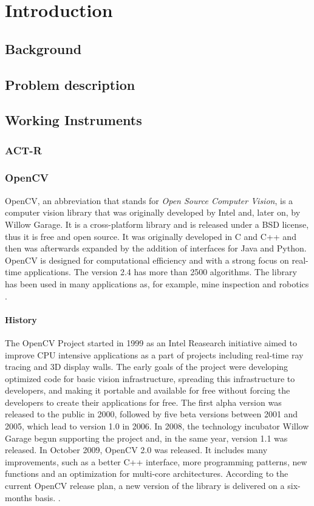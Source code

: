 \chapter{Introduction}
\section{Background}
\section{Problem description}
\section{Working Instruments}
\subsection{ACT-R}
\subsection{OpenCV}
	OpenCV, an abbreviation that stands for \emph{Open Source Computer Vision}, is a computer vision library that was originally developed by Intel and, later on, by Willow Garage.
	It is a cross-platform library and is released under a BSD license, thus it is free and open source. It was originally developed in C and C++ and then was afterwards expanded by the addition of interfaces for Java and Python. OpenCV is designed for computational efficiency and with a strong focus on real-time applications. The version 2.4 has more than 2500 algorithms. The library has been used in many applications as, for example, mine inspection and robotics \cite{OpenCV:MainWebPage}.
	
	
	\subsubsection*{History}
	The OpenCV Project started in 1999 as an Intel Reasearch initiative aimed to improve CPU intensive applications as a part of projects including real-time ray tracing and 3D display walls. The early goals of the project were developing optimized code for basic vision infrastructure, spreading this infrastructure to developers, and making it portable and available for free without forcing the developers to create their applications for free.
	The first alpha version was released to the public in 2000, followed by five beta versions between 2001 and 2005, which lead to version 1.0 in 2006. In 2008, the technology incubator Willow Garage begun supporting the project and, in the same year, version 1.1  was released. 
	In October 2009, OpenCV 2.0 was released. It includes many improvements, such as a better C++ interface, more programming patterns, new functions and an optimization for multi-core architectures. According to the current OpenCV release plan, a new version of the library is delivered on a six-months basis. \cite{OpenCV:ChangeLogs}.
	
